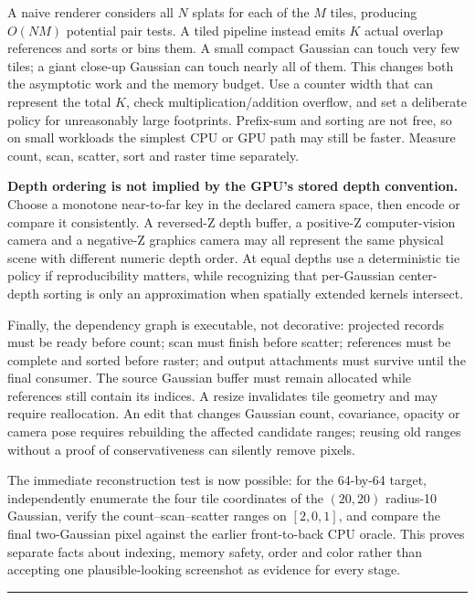 A naive renderer considers all \(N\) splats for each of the \(M\) tiles, producing \(O(NM)\) potential pair tests. A tiled pipeline instead emits \(K\) actual overlap references and sorts or bins them. A small compact Gaussian can touch very few tiles; a giant close-up Gaussian can touch nearly all of them. This changes both the asymptotic work and the memory budget. Use a counter width that can represent the total \(K\), check multiplication/addition overflow, and set a deliberate policy for unreasonably large footprints. Prefix-sum and sorting are not free, so on small workloads the simplest CPU or GPU path may still be faster. Measure count, scan, scatter, sort and raster time separately.

\textbf{Depth ordering is not implied by the GPU's stored depth convention.} Choose a monotone near-to-far key in the declared camera space, then encode or compare it consistently. A reversed-Z depth buffer, a positive-Z computer-vision camera and a negative-Z graphics camera may all represent the same physical scene with different numeric depth order. At equal depths use a deterministic tie policy if reproducibility matters, while recognizing that per-Gaussian center-depth sorting is only an approximation when spatially extended kernels intersect.

Finally, the dependency graph is executable, not decorative: projected records must be ready before count; scan must finish before scatter; references must be complete and sorted before raster; and output attachments must survive until the final consumer. The source Gaussian buffer must remain allocated while references still contain its indices. A resize invalidates tile geometry and may require reallocation. An edit that changes Gaussian count, covariance, opacity or camera pose requires rebuilding the affected candidate ranges; reusing old ranges without a proof of conservativeness can silently remove pixels.

The immediate reconstruction test is now possible: for the 64-by-64 target, independently enumerate the four tile coordinates of the \((20,20)\) radius-10 Gaussian, verify the count--scan--scatter ranges on \([2,0,1]\), and compare the final two-Gaussian pixel against the earlier front-to-back CPU oracle. This proves separate facts about indexing, memory safety, order and color rather than accepting one plausible-looking screenshot as evidence for every stage.

\begin{center}\rule{0.5\linewidth}{0.5pt}\end{center}

